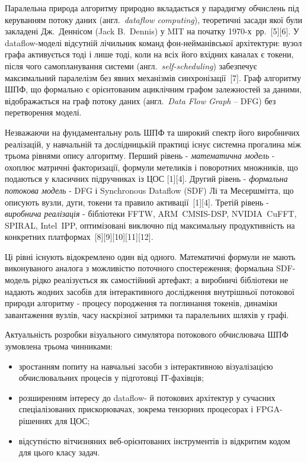 \documentclass[
]{article}
\begin{document}
Паралельна природа алгоритму природно вкладається у парадигму обчислень
під керуванням потоку даних (англ.~\emph{dataflow computing}),
теоретичні засади якої були закладені Дж.~Деннісом (Jack B.~Dennis) у
MIT на початку 1970-х~рр.~{[}5{]}{[}6{]}. У dataflow-моделі відсутній
лічильник команд фон-нейманівської архітектури: вузол графа активується
тоді і лише тоді, коли на всіх його вхідних каналах є токени, після чого
самопланування системи (англ.~\emph{self-scheduling}) забезпечує
максимальний паралелізм без явних механізмів синхронізації~{[}7{]}. Граф
алгоритму ШПФ, що формально є орієнтованим ациклічним графом залежностей
за даними, відображається на граф потоку даних (англ.~\emph{Data Flow
Graph} -- DFG) без перетворення моделі.

Незважаючи на фундаментальну роль ШПФ та широкий спектр його виробничих
реалізацій, у навчальній та дослідницькій практиці існує системна
прогалина між трьома рівнями опису алгоритму. Перший рівень -
\emph{математична модель} - охоплює матричні факторизації, формули
метеликів і поворотних множників, що подаються у класичних підручниках
із ЦОС {[}1{]}{[}4{]}. Другий рівень - \emph{формальна потокова модель}
- DFG і Synchronous Dataflow (SDF) Лі та Месершмітта, що описують вузли,
дуги, токени та правило активації~{[}1{]}{[}4{]}. Третій рівень -
\emph{виробнича реалізація} - бібліотеки FFTW, ARM~CMSIS-DSP,
NVIDIA~CuFFT, SPIRAL, Intel~IPP, оптимізовані виключно під максимальну
продуктивність на конкретних
платформах~{[}8{]}{[}9{]}{[}10{]}{[}11{]}{[}12{]}.

Ці рівні існують відокремлено один від одного. Математичні формули не
мають виконуваного аналога з можливістю поточного спостереження;
формальна SDF-модель рідко реалізується як самостійний артефакт; а
виробничі бібліотеки не надають жодних засобів для інтерактивного
дослідження внутрішньої потокової природи алгоритму - процесу породження
та поглинання токенів, динаміки завантаження вузлів, часу наскрізної
затримки та паралельних шляхів у графі.

Актуальність розробки візуального симулятора потокового обчислювача ШПФ
зумовлена трьома чинниками:

\begin{itemize}
\item
  зростанням попиту на навчальні засоби з інтерактивною візуалізацією
  обчислювальних процесів у підготовці ІТ-фахівців;
\item
  розширенням інтересу до dataflow- й потокових архітектур у сучасних
  спеціалізованих прискорювачах, зокрема тензорних процесорах і
  FPGA-рішеннях для ЦОС;
\item
  відсутністю вітчизняних веб-орієнтованих інструментів із відкритим
  кодом для цього класу задач.
\end{itemize}
\end{document}
